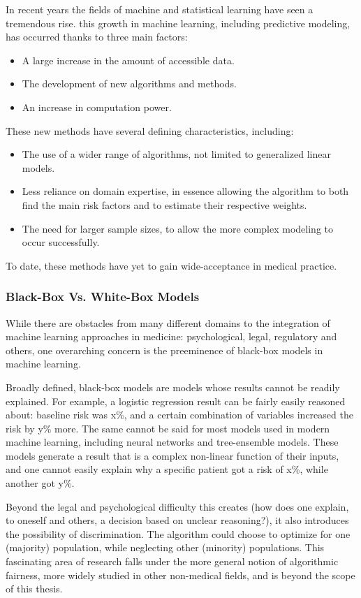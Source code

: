 \documentclass[a4paper,12pt]{article}
\begin{document}
			In recent years the fields of machine and statistical learning have seen a tremendous rise\cite{Obermeyer2016}. this growth in machine learning, including predictive modeling, has occurred thanks to three main factors\cite{Shalev-Shwartz2014}:
			\begin{itemize}
				\item A large increase in the amount of accessible data.
				\item The development of new algorithms and methods.
				\item An increase in computation power.
			\end{itemize} 
			These new methods have several defining characteristics, including:
			\begin{itemize}
				\item The use of a wider range of algorithms, not limited to generalized linear models.
				\item Less reliance on domain expertise, in essence allowing the algorithm to both find the main risk factors and to estimate their respective weights.
				\item The need for larger sample sizes, to allow the more complex modeling to occur successfully.
			\end{itemize}
			To date, these methods have yet to gain wide-acceptance in medical practice\cite{Obermeyer2016,Deo2015}.
			
			\subsubsection{Black-Box Vs. White-Box Models}
			While there are obstacles from many different domains to the integration of machine learning approaches in medicine: psychological, legal, regulatory and others, one overarching concern is the preeminence of black-box models in machine learning\cite{Price2015}.
			
			Broadly defined, black-box models are models whose results cannot be readily explained. For example, a logistic regression result can be fairly easily reasoned about: baseline risk was x\%, and a certain combination of variables increased the risk by y\% more. The same cannot be said for most models used in modern machine learning, including neural networks and tree-ensemble models. These models generate a result that is a complex non-linear function of their inputs, and one cannot easily explain why a specific patient got a risk of x\%, while another got y\%.
			
			Beyond the legal and psychological difficulty this creates (how does one explain, to oneself and others, a decision based on unclear reasoning?), it also introduces the possibility of discrimination. The algorithm could choose to optimize for one (majority) population, while neglecting other (minority) populations\cite{Hebert-Johnson2017}. This fascinating area of research falls under the more general notion of algorithmic fairness, more widely studied in other non-medical fields\cite{Corbett-Davies2017}, and is beyond the scope of this thesis.
			
\end{document}

